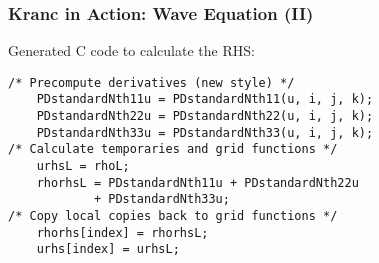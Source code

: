 
\begin{frame}[fragile]
\frametitle{Kranc in Action: Wave Equation (II)}
\begin{block}{Generated C code to calculate the RHS:}
\begin{verbatim}
/* Precompute derivatives (new style) */
    PDstandardNth11u = PDstandardNth11(u, i, j, k);
    PDstandardNth22u = PDstandardNth22(u, i, j, k);
    PDstandardNth33u = PDstandardNth33(u, i, j, k);
/* Calculate temporaries and grid functions */
    urhsL = rhoL;
    rhorhsL = PDstandardNth11u + PDstandardNth22u
            + PDstandardNth33u;
/* Copy local copies back to grid functions */
    rhorhs[index] = rhorhsL;
    urhs[index] = urhsL;
\end{verbatim}
\end{block}
\end{frame}